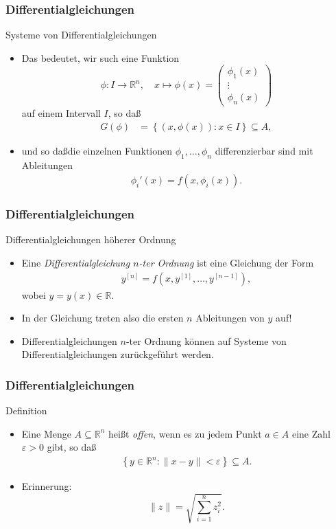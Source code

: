 \documentclass{beamer}
\renewcommand{\emph}[1]{{\textcolor{solarizedRed}{\itshape #1}}}
\newcommand\RR{\mathbb R}
\newcommand{\eps}{\varepsilon}
\newcommand\cbc[1]{\left\{{#1}\right\}}
\renewcommand{\oe}{\"o}
\newcommand{\ue}{\"u}
\newcommand{\mytitle}{Differentialgleichungen}
\begin{document}
\begin{frame}\frametitle{\mytitle}
	\begin{block}{Systeme von Differentialgleichungen}
		\begin{itemize}
			\item Das bedeutet, wir such eine Funktion $$\phi:I\to\RR^n,\quad x\mapsto\phi(x)=\begin{pmatrix}\phi_1(x)\\\vdots\\\phi_n(x)\end{pmatrix}$$ auf einem Intervall $I$, so da\ss
				\begin{align*}
					G(\phi)&=\cbc{(x,\phi(x)):x\in I}\subseteq A,
				\end{align*}
			\item und so da\ss die einzelnen Funktionen $\phi_1,\ldots,\phi_n$ differenzierbar sind mit Ableitungen
			\begin{align*}
				\phi_i'(x)=f(x,\phi_i(x)).
			\end{align*}
		\end{itemize}
	\end{block}
\end{frame}

\begin{frame}\frametitle{\mytitle}
	\begin{block}{Differentialgleichungen h\oe herer Ordnung}
		\begin{itemize}
			\item Eine \emph{Differentialgleichung $n$-ter Ordnung} ist eine Gleichung der Form
				\begin{align*}
					y^{[n]}=f(x,y^{[1]},\ldots,y^{[n-1]}),
				\end{align*}
				wobei $y=y(x)\in\RR$.
			\item In der Gleichung treten also die ersten $n$ Ableitungen von $y$ auf!
			\item Differentialgleichungen $n$-ter Ordnung k\oe nnen auf Systeme von Differentialgleichungen zur\ue ckgef\ue hrt werden.
		\end{itemize}
	\end{block}
\end{frame}

\begin{frame}\frametitle{\mytitle}
	\begin{block}{Definition}
		\begin{itemize}
			\item Eine Menge $A\subseteq\RR^n$ hei\ss t \emph{offen}, wenn es zu jedem Punkt $a\in A$ eine Zahl $\eps>0$ gibt, so da\ss\
				\begin{align*}
					\cbc{y\in\RR^n:\|x-y\|<\eps}\subseteq A.
				\end{align*}
			\item \alert{Erinnerung:} $$\|z\|=\sqrt{\sum_{i=1}^nz_i^2}.$$
		\end{itemize}
	\end{block}
\end{frame}
\end{document}
